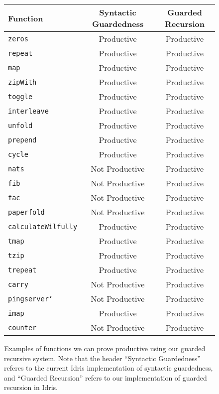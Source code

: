 \begin{figure}[h]
\begin{center}
  \begin{tabular}{| l | c | c |} \hline
    Function & Syntactic Guardedness & Guarded Recursion \\ \hline
    \texttt{zeros} & Productive & Productive \\ \hline
    \texttt{repeat} & Productive & Productive \\ \hline
    \texttt{map} & Productive & Productive \\ \hline
    \texttt{zipWith} & Productive & Productive \\ \hline
    \texttt{toggle} & Productive & Productive \\ \hline
    \texttt{interleave} & Productive & Productive \\ \hline
    \texttt{unfold} & Productive & Productive \\ \hline
    \texttt{prepend} & Productive & Productive \\ \hline
    \texttt{cycle} & Productive & Productive \\ \hline
    \texttt{nats} & Not Productive & Productive \\ \hline
    \texttt{fib} & Not Productive & Productive \\ \hline
    \texttt{fac} & Not Productive & Productive \\ \hline
    \texttt{paperfold} & Not Productive & Productive \\ \hline
    \texttt{calculateWilfully} & Productive & Productive \\ \hline
    \texttt{tmap} & Productive & Productive \\ \hline
    \texttt{tzip} & Productive & Productive \\ \hline
    \texttt{trepeat} & Productive & Productive \\ \hline
    \texttt{carry} & Not Productive & Productive \\ \hline
    \texttt{pingserver'} & Not Productive & Productive \\ \hline
    \texttt{imap} & Productive & Productive \\ \hline
    \texttt{counter} & Not Productive & Productive \\ \hline
  \end{tabular}
\end{center}
  \caption{Examples of functions we can prove productive using our guarded
    recursive system. Note that the header ``Syntactic Guardedness'' referes to the current
    Idris implementation of syntactic guardedness, and ``Guarded Recursion''
    refers to our implementation of guarded recursion in Idris.}
  \label{fig:productivity_table_1}
\end{figure}


